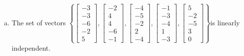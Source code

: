 \begin{exerciseAnswer}
\begin{enumerate}[(a)]
\item  The set of vectors \( \left\{ \left[\begin{array}{c}
-3 \\
-3 \\
-6 \\
-2 \\
5
\end{array}\right] , \left[\begin{array}{c}
-2 \\
4 \\
4 \\
-6 \\
-1
\end{array}\right] , \left[\begin{array}{c}
-4 \\
-5 \\
-2 \\
2 \\
-4
\end{array}\right] , \left[\begin{array}{c}
-1 \\
-3 \\
-4 \\
1 \\
-3
\end{array}\right] , \left[\begin{array}{c}
5 \\
-2 \\
-5 \\
3 \\
0
\end{array}\right] \right\} \)is linearly independent.
\end{enumerate}
    
\end{exerciseAnswer}
    
